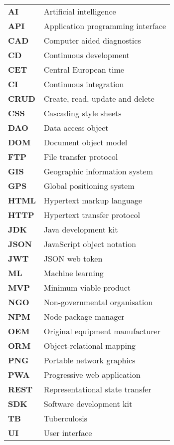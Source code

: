 
\paragraph{}
\hspace {0.1cm} 

\begin{tabular}{>{\raggedright\arraybackslash}p{1cm}>{\raggedright\arraybackslash}p{15cm}}

\textbf{AI} &  Artificial intelligence\\
\textbf{API} &  Application programming interface\\
\textbf{CAD} &  Computer aided diagnostics\\
\textbf{CD} &  Continuous development\\
\textbf{CET} &  Central European time\\
\textbf{CI} &  Continuous integration\\
\textbf{CRUD} &  Create, read, update and delete\\
\textbf{CSS} &  Cascading style sheets\\
\textbf{DAO} &  Data access object\\
\textbf{DOM} &  Document object model\\
\textbf{FTP} &  File transfer protocol\\
\textbf{GIS} &  Geographic information system\\
\textbf{GPS} &  Global positioning system\\
\textbf{HTML} &  Hypertext markup language\\
\textbf{HTTP} &  Hypertext transfer protocol\\
\textbf{JDK} &  Java development kit\\
\textbf{JSON} &  JavaScript object notation\\
\textbf{JWT} &  JSON web token\\
\textbf{ML} &  Machine learning\\
\textbf{MVP} &  Minimum viable product\\
\textbf{NGO} &  Non-governmental organisation\\
\textbf{NPM} &  Node package manager\\
\textbf{OEM} &  Original equipment manufacturer\\
\textbf{ORM} &  Object-relational mapping\\
\textbf{PNG} &  Portable network graphics\\
\textbf{PWA} &  Progressive web application\\
\textbf{REST} &  Representational state transfer\\
\textbf{SDK} &  Software development kit\\
\textbf{TB} &  Tuberculosis\\
\textbf{UI} &  User interface\\

\end{tabular}
\newline
